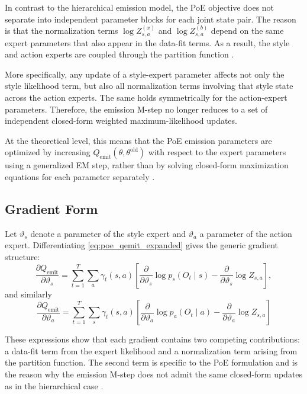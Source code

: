 In contrast to the hierarchical emission model, the \ac{PoE} objective does not separate into 
independent parameter blocks for each joint state pair. The reason is that the normalization terms 
\(\log Z_{s,a}^{(x)}\) and \(\log Z_{s,a}^{(b)}\) depend on the same expert parameters that also 
appear in the data-fit terms. As a result, the style and action experts are coupled through the 
partition function \cite{Hinton2002}.

More specifically, any update of a style-expert parameter affects not only the style likelihood term, 
but also all normalization terms involving that style state across the action experts. The same holds 
symmetrically for the action-expert parameters. Therefore, the emission M-step no longer reduces to a 
set of independent closed-form weighted maximum-likelihood updates.

At the theoretical level, this means that the \ac{PoE} emission parameters are optimized by increasing 
$
Q_{\mathrm{emit}}(\theta,\theta^{\mathrm{old}})
$ 
with respect to the expert parameters using a generalized \ac{EM} step, rather than by solving 
closed-form maximization equations for each parameter separately \cite{Dempster1977,Wu1983}.

\subsection{Gradient Form}

Let \(\vartheta_s\) denote a parameter of the style expert and \(\vartheta_a\) a parameter of the 
action expert. Differentiating \eqref{eq:poe_qemit_expanded} gives the generic gradient structure:
\begin{equation}
\frac{\partial Q_{\mathrm{emit}}}{\partial \vartheta_s}
=
\sum_{t=1}^{T}\sum_{a}
\gamma_t(s,a)
\left[
\frac{\partial}{\partial \vartheta_s}\log p_s(O_t \mid s)
-
\frac{\partial}{\partial \vartheta_s}\log Z_{s,a}
\right],
\label{eq:poe_style_grad}
\end{equation}
and similarly
\begin{equation}
\frac{\partial Q_{\mathrm{emit}}}{\partial \vartheta_a}
=
\sum_{t=1}^{T}\sum_{s}
\gamma_t(s,a)
\left[
\frac{\partial}{\partial \vartheta_a}\log p_a(O_t \mid a)
-
\frac{\partial}{\partial \vartheta_a}\log Z_{s,a}
\right]
\label{eq:poe_action_grad}
\end{equation}

These expressions show that each gradient contains two competing contributions:
a data-fit term from the expert likelihood and a normalization term arising from the partition 
function. The second term is specific to the \ac{PoE} formulation and is the reason why the 
emission M-step does not admit the same closed-form updates as in the hierarchical case 
\cite{Hinton2002}.